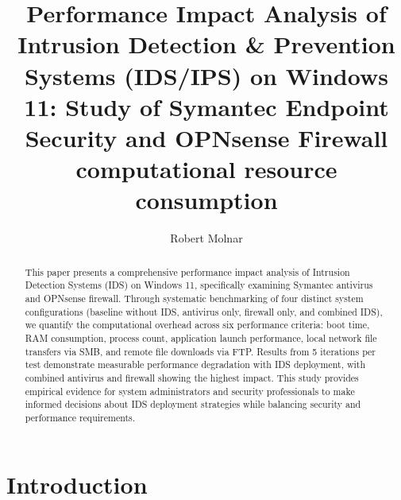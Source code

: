 \documentclass[runningheads,a4paper,english]{llncs}[2022/01/12]
\begin{document}
\title{Performance Impact Analysis of Intrusion Detection \& Prevention Systems (IDS/IPS) on Windows 11: Study of Symantec Endpoint Security and OPNsense Firewall computational resource consumption}

\author{Robert Molnar}



%
%

\maketitle

\begin{abstract}
This paper presents a comprehensive performance impact analysis of Intrusion Detection Systems (IDS) on Windows 11, specifically examining Symantec antivirus and OPNsense firewall. Through systematic benchmarking of four distinct system configurations (baseline without IDS, antivirus only, firewall only, and combined IDS), we quantify the computational overhead across six performance criteria: boot time, RAM consumption, process count, application launch performance, local network file transfers via SMB, and remote file downloads via FTP. Results from 5 iterations per test demonstrate measurable performance degradation with IDS deployment, with combined antivirus and firewall showing the highest impact. This study provides empirical evidence for system administrators and security professionals to make informed decisions about IDS deployment strategies while balancing security and performance requirements.

\end{abstract}


\section{Introduction}
\label{sec:introduction}
\end{document}

